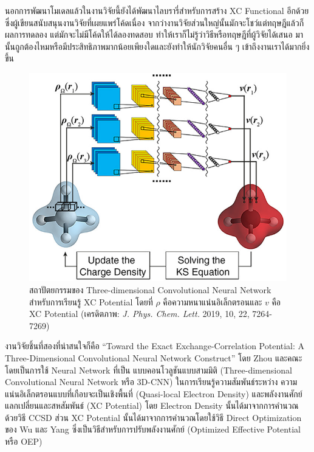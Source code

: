 นอกการพัฒนาโมเดลแล้วในงานวิจัยนี้ยังได้พัฒนาไลบรารี่สำหรับการสร้าง XC Functional อีกด้วยซึ่งผู้เขียนสนับสนุนงานวิจัยที่เผยแพร่โค้ดเนื่อง%
จากว่างานวิจัยส่วนใหญ่นั้นมักจะโชว์แต่ทฤษฎีแล้วก็ผลการทดลอง แต่มักจะไม่มีโค้ดให้ได้ลองทดสอบ ทำให้เราก็ไม่รู้ว่าวิธีหรือทฤษฎีที่ผู้วิจัยได้เสนอ%
มานั้นถูกต้องไหมหรือมีประสิทธิภาพมากน้อยเพียงใดและยังทำให้นักวิจัยคนอื่น ๆ เข้าถึงงานเราได้มากยิ่งขึ้น

\begin{figure}[H]
    \centering
    \includegraphics[width=0.9\linewidth]{fig/ml-xc-conv-network.jpeg}
    \caption{สถาปัตยกรรมของ Three-dimensional Convolutional Neural Network สำหรับการเรียนรู้ XC Potential โดยที่ 
    $\rho$ คือความหนาแน่นอิเล็กตรอนและ $v$ คือ XC Potential (เครดิตภาพ: \textit{J. Phys. Chem. Lett.} 2019, 10, 22, 
    7264-7269)}
    \label{fig:xc_3dcnn}
\end{figure}

งานวิจัยชิ้นที่สองที่น่าสนใจก็คือ \enquote{Toward the Exact Exchange-Correlation Potential: A Three-Dimensional 
Convolutional Neural Network Construct} โดย Zhou และคณะ\autocite{zhou2019} โดยเป็นการใช้ Neural Network ที่เป็น%
แบบคอนโวลูชันแบบสามมิติ (Three-dimensional Convolutional Neural Network หรือ 3D-CNN) ในการเรียนรู้ความสัมพันธ์ระหว่าง%
ความแน่นอิเล็กตรอนแบบที่เกือบจะเป็นเชิงพื้นที่ (Quasi-local Electron Density) และพลังงานศักย์แลกเปลี่ยนและสหสัมพันธ์ (XC Potential) 
โดย Electron Density นั้นได้มาจากการคำนวณด้วยวิธี CCSD ส่วน XC Potential นั้นได้มาจากการคำนวณโดยใช้วิธี Direct Optimization 
ของ Wu และ Yang\autocite{wu2003} ซึ่งเป็นวิธีสำหรับการปรับพลังงานศักย์ (Optimized Effective Potential หรือ OEP)

